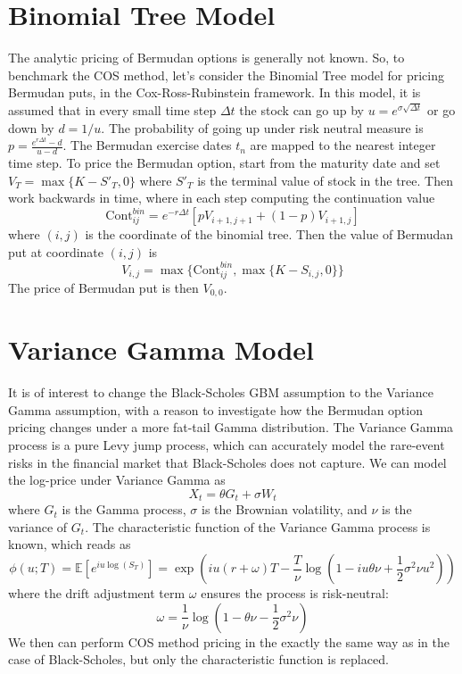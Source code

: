 \documentclass{article}
\begin{document}
\section{Binomial Tree Model}
The analytic pricing of Bermudan options is generally not known. So, to benchmark the COS method, let's consider the Binomial Tree model for pricing Bermudan puts, in the Cox-Ross-Rubinstein framework. In this model, it is assumed that in every small time step $\Delta t$ the stock can go up by $u=e^{\sigma \sqrt{\Delta t}}$ or go down by $d = 1/u $. The probability of going up under risk neutral measure is $p=\frac{ e^{r \Delta t}-d }{u-d} $. The Bermudan exercise dates $t_n$ are mapped to the nearest integer time step. To price the Bermudan option, start from the maturity date and set $V_T=\max \{ K -S'_T,0 \}$ where $S'_T$ is the terminal value of stock in the tree. Then work backwards in time, where in each step computing the continuation value 
$$
\text{Cont}^{bin}_{ij} = e^{-r \Delta t} [pV_{i+1, j+1}+(1-p)V_{i+1,j}]
$$
where $(i,j)$ is the coordinate of the binomial tree. Then the value of Bermudan put at coordinate $(i,j)$ is 
$$
V_{i,j} = \max \{ \text{Cont}^{bin}_{ij}, \max \{ K - S_{i,j}, 0 \}  \}
$$
The price of Bermudan put is then $V_{0,0}.$

\section{Variance Gamma Model}
It is of interest to change the Black-Scholes GBM assumption to the Variance Gamma assumption, with a reason to investigate how the Bermudan option pricing changes under a more fat-tail Gamma distribution. The Variance Gamma process is a pure Levy jump process, which can accurately model the rare-event risks in the financial market that Black-Scholes does not capture. We can model the log-price under Variance Gamma as
$$
X_t = \theta G_t + \sigma W_t
$$
where $G_t$ is the Gamma process, $\sigma$ is the Brownian volatility, and $\nu$ is the variance of $G_t$. The characteristic function of the Variance Gamma process is known, which reads as 
$$
\phi(u; T) = \mathbb{E}\left[ e^{i u \log(S_T)} \right]
= \exp\left( i u (r + \omega) T - \frac{T}{\nu} \log\left(1 - i u \theta \nu + \frac{1}{2} \sigma^2 \nu u^2 \right) \right)
$$
where the drift adjustment term $\omega$ ensures the process is risk-neutral:
$$
\omega = \frac{1}{\nu} \log\left( 1 - \theta \nu - \frac{1}{2} \sigma^2 \nu \right)
$$
We then can perform COS method pricing in the exactly the same way as in the case of Black-Scholes, but only the characteristic function is replaced.
\end{document}
